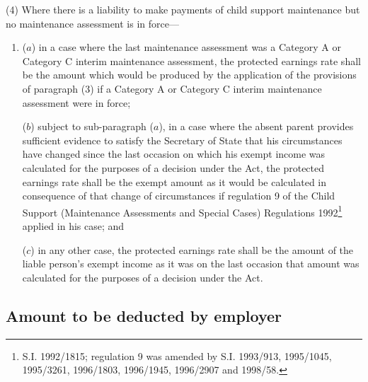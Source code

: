 \documentclass[12pt,a4paper]{article}
\begin{document}
(4) Where there is a liability to make payments of child support maintenance but no maintenance assessment is in force—
\begin{enumerate}\item[]
($a$) in a case where the last maintenance assessment was a Category A or Category C interim maintenance assessment, the protected earnings rate shall be the amount which would be produced by the application of the provisions of paragraph (3) if a Category A or Category C interim maintenance assessment were in force;

($b$) subject to sub-paragraph ($a$), in a case where the absent parent provides sufficient evidence to satisfy the Secretary of State that his circumstances have changed since the last occasion on which his exempt income was calculated for the purposes of a decision under the Act, the protected earnings rate shall be the exempt amount as it would be calculated in consequence of that change of circumstances if regulation 9 of the Child Support (Maintenance Assessments and Special Cases) Regulations 1992\footnote{\frenchspacing S.I. 1992/1815; regulation 9 was amended by S.I. 1993/913, 1995/1045, 1995/3261, 1996/1803, 1996/1945, 1996/2907 and 1998/58.} applied in his case; and

($c$) in any other case, the protected earnings rate shall be the amount of the liable person’s exempt income as it was on the last occasion that amount was calculated for the purposes of a decision under the Act.
\end{enumerate}


\subsection[12. Amount to be deducted by employer]{Amount to be deducted by employer}
\end{document}
